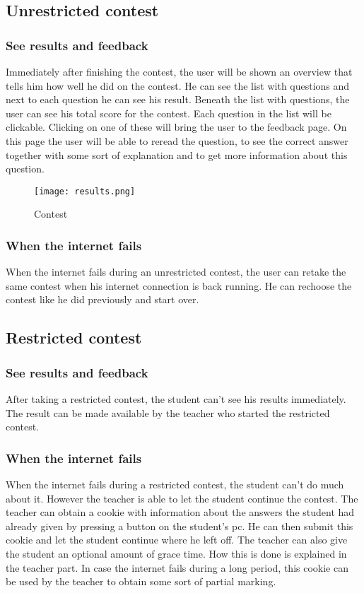 \subsection{Unrestricted contest}

\subsubsection{See results and feedback}
Immediately after finishing the contest, the user will be shown an overview that tells him how well he did on the contest. He can see the list with questions and next to each question he can see his result. Beneath the list with questions, the user can see his total score for the contest. Each question in the list will be clickable. Clicking on one of these will bring the user to the feedback page. On this page the user will be able to reread the question, to see the correct answer together with some sort of explanation and to get more information about this question.  

		\begin{figure}[h]
		  \centering
			\texttt{[image: results.png]}
		  \caption{Contest}
		  \label{Contest}
		\end{figure}

\subsubsection{When the internet fails}
When the internet fails during an unrestricted contest, the user can retake the same contest when his internet connection is back running. He can rechoose the contest like he did previously and start over. 

\subsection{Restricted contest}

\subsubsection{See results and feedback}
After taking a restricted contest, the student can't see his results immediately. The result can be made available by the teacher who started the restricted contest. 

\subsubsection{When the internet fails}
When the internet fails during a restricted contest, the student can't do much about it. However the teacher is able to let the student continue the contest. The teacher can obtain a cookie with information about the answers the student had already given by pressing a button on the student's pc. He can then submit this cookie and let the student continue where he left off. The teacher can also give the student an optional amount of grace time. How this is done is explained in the teacher part. In case the internet fails during a long period, this cookie can be used by the teacher to obtain some sort of partial marking. 

